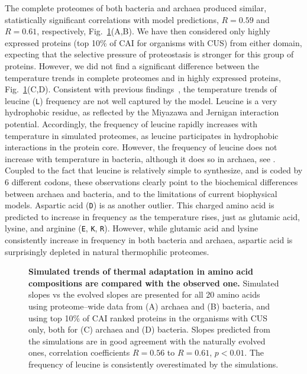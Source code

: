 \documentclass[10pt,letterpaper]{article}
\begin{document}
The complete proteomes of both bacteria and archaea produced similar, statistically significant correlations with model predictions, $R=0.59$ and $R=0.61$, respectively, Fig.~\ref{fig:fig5}(A,B). We have then considered only highly expressed proteins (top 10\% of CAI for organisms with CUS) from either domain, expecting that the selective pressure of proteostasis is stronger for this group of proteins. However, we did not find a significant difference between the temperature trends in complete proteomes and in highly expressed proteins, Fig.~\ref{fig:fig5}(C,D). Consistent with previous findings~\cite{Venev2015Massively}, the temperature trends of leucine (\texttt{L}) frequency are not well captured by the model. Leucine is a very hydrophobic residue, as reflected by the Miyazawa and Jernigan interaction potential. Accordingly, the frequency of leucine rapidly increases with temperature in simulated proteomes, as leucine participates in hydrophobic interactions in the protein core. However, the frequency of leucine does not increase with temperature in bacteria, although it does so in archaea, see . Coupled to the fact that leucine is relatively simple to synthesize, and is coded by 6 different codons, these observations clearly point to the biochemical differences between archaea and bacteria, and to the limitations of current biophysical models. Aspartic acid (\texttt{D}) is as another outlier. This charged amino acid is predicted to increase in frequency as the temperature rises, just as glutamic acid, lysine, and arginine (\texttt{E}, \texttt{K}, \texttt{R}). However, while glutamic acid and lysine consistently increase in frequency in both bacteria and archaea, aspartic acid is surprisingly depleted in natural thermophilic proteomes.

\begin{figure}[h!]
\caption{
{\bf Simulated trends of thermal adaptation in amino acid compositions are compared with the observed one.} Simulated slopes vs the evolved slopes are presented for all 20 amino acids using proteome--wide data from (A) archaea and (B) bacteria, and using top 10\% of CAI ranked proteins in the organisms with CUS only, both for (C) archaea and (D) bacteria. Slopes predicted from the simulations are in good agreement with the naturally evolved ones, correlation coefficients $R=0.56$ to $R=0.61$, $p<0.01$. The frequency of leucine is consistently overestimated by the simulations.
}
\label{fig:fig5}
\end{figure}
\end{document}

